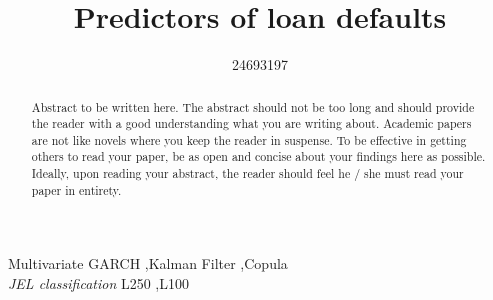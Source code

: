 \documentclass[11pt,preprint]{elsarticle}
\numberwithin{equation}{section}
\numberwithin{figure}{section}
\numberwithin{table}{section}
\begin{document}
\begin{frontmatter}  %

\title{Predictors of loan defaults}





\author[Add1]{24693197}
\ead{}





\address[Add1]{Stellenbosch University, South Africa}


\begin{abstract}
\small{
Abstract to be written here. The abstract should not be too long and
should provide the reader with a good understanding what you are writing
about. Academic papers are not like novels where you keep the reader in
suspense. To be effective in getting others to read your paper, be as
open and concise about your findings here as possible. Ideally, upon
reading your abstract, the reader should feel he / she must read your
paper in entirety.
}
\end{abstract}

\vspace{1cm}


\begin{keyword}
\footnotesize{
Multivariate GARCH \sep Kalman Filter \sep Copula \\
\vspace{0.3cm}
}
\footnotesize{
\textit{JEL classification} L250 \sep L100
}
\end{keyword}



\vspace{0.5cm}

\end{frontmatter}

\setcounter{footnote}{0}



\pagestyle{fancy}
\chead{}
\rhead{}
\lfoot{}
\lhead{}
\cfoot{}


\headsep 35pt %
\end{document}
